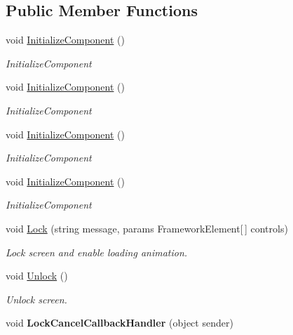 \subsection*{Public Member Functions}
\begin{DoxyCompactItemize}
\item 
void \mbox{\hyperlink{class_wpf_handler_1_1_u_i_1_1_controls_1_1_lock_screen_aacd97a7da29eefb57cc695f5af31dce5}{Initialize\+Component}} ()
\begin{DoxyCompactList}\small\item\em Initialize\+Component \end{DoxyCompactList}\item 
void \mbox{\hyperlink{class_wpf_handler_1_1_u_i_1_1_controls_1_1_lock_screen_aacd97a7da29eefb57cc695f5af31dce5}{Initialize\+Component}} ()
\begin{DoxyCompactList}\small\item\em Initialize\+Component \end{DoxyCompactList}\item 
void \mbox{\hyperlink{class_wpf_handler_1_1_u_i_1_1_controls_1_1_lock_screen_aacd97a7da29eefb57cc695f5af31dce5}{Initialize\+Component}} ()
\begin{DoxyCompactList}\small\item\em Initialize\+Component \end{DoxyCompactList}\item 
void \mbox{\hyperlink{class_wpf_handler_1_1_u_i_1_1_controls_1_1_lock_screen_aacd97a7da29eefb57cc695f5af31dce5}{Initialize\+Component}} ()
\begin{DoxyCompactList}\small\item\em Initialize\+Component \end{DoxyCompactList}\item 
void \mbox{\hyperlink{class_wpf_handler_1_1_u_i_1_1_controls_1_1_lock_screen_ae53cb9098b105a55f6da81acf3703e69}{Lock}} (string message, params Framework\+Element\mbox{[}$\,$\mbox{]} controls)
\begin{DoxyCompactList}\small\item\em Lock screen and enable loading animation. \end{DoxyCompactList}\item 
void \mbox{\hyperlink{class_wpf_handler_1_1_u_i_1_1_controls_1_1_lock_screen_a2411f98b2544601d6310967dc93064a2}{Unlock}} ()
\begin{DoxyCompactList}\small\item\em Unlock screen. \end{DoxyCompactList}\item 
\mbox{\label{class_wpf_handler_1_1_u_i_1_1_controls_1_1_lock_screen_a780b13daab4235569b6705639acfe245}} 
void {\bfseries Lock\+Cancel\+Callback\+Handler} (object sender)
\end{DoxyCompactItemize}
